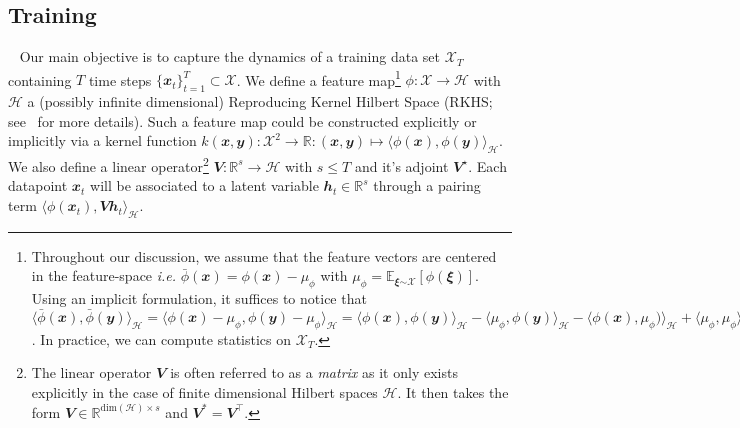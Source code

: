 \subsection{Training}~\label{sec:training}
Our main objective is to capture the dynamics of a training data set $\mathcal{X}_T$ containing $T$ time steps $\{\mathbfit{x}_{t}\}_{t=1} ^{T} \subset{\mathscr{X}}$.
We define a feature map\footnote{Throughout our discussion, we assume that the feature vectors are centered in the feature-space \emph{i.e.} $\bar{\phi}(\mathbfit{x}) = \phi(\mathbfit{x}) - \mu_{\phi}$ with $\mu_{\phi} = \mathbb{E}_{\mathbfit{\xi}\mathcal{\sim X}}\left[\phi(\mathbfit{\xi})\right]$.
Using an implicit formulation, it suffices to notice that $\langle\bar{\phi}(\mathbfit{x}), \bar{\phi}(\mathbfit{y}) \rangle_{\mathscr{H}} = \langle\phi(\mathbfit{x}) - \mu_{\phi}, \phi(\mathbfit{y}) - \mu_{\phi} \rangle_{\mathscr{H}} = \langle\phi(\mathbfit{x}), \phi(\mathbfit{y})\rangle_{\mathscr{H}} - \langle\mu_{\phi}, \phi(\mathbfit{y})\rangle_{\mathscr{H}} - \langle\phi(\mathbfit{x}), \mu_{\phi})\rangle_{\mathscr{H}} + \langle\mu_{\phi}, \mu_{\phi}\rangle_{\mathscr{H}} = k(\mathbfit{x},\mathbfit{y}) - \mathbb{E}_{\mathbfit{\xi}\mathcal{\sim X}}\left[k(\mathbfit{\xi},\mathbfit{y})\right] - \mathbb{E}_{\mathbfit{\zeta}\mathcal{\sim X}}\left[k(\mathbfit{x},\mathbfit{\zeta})\right] + \mathbb{E}_{\mathbfit{\xi},\mathbfit{\zeta}\mathcal{\sim X}}\left[k(\mathbfit{\xi},\mathbfit{\zeta})\right]$.
In practice, we can compute statistics on $\mathcal{X}_T$.} $\phi: \mathscr{X} \rightarrow \mathscr{H}$ with $\mathscr{H}$ a (possibly infinite dimensional) Reproducing Kernel Hilbert Space (RKHS; see~\cite{scholkopf1997kernel} for more details).
Such a feature map could be constructed explicitly or implicitly via a kernel function $ k(\mathbfit{x},\mathbfit{y}) : \mathscr{X}^2 \rightarrow \mathbb{R} : \left(\mathbfit{x},\mathbfit{y} \right) \mapsto \langle\phi(\mathbfit{x}), \phi(\mathbfit{y})\rangle_{\mathscr{H}}$.
We also define a linear operator\footnote{The linear operator $\mathbfit{V}$ is often referred to as a \emph{matrix} as it only exists explicitly in the case of finite dimensional Hilbert spaces $\mathscr{H}$.
It then takes the form $\mathbfit{V} \in \mathbb{R}^{\mathrm{dim}(\mathscr{H}) \times s}$ and $\mathbfit{V}^* = \mathbfit{V}^{\top}$.} $\mathbfit{V}:\mathbb{R}^s \rightarrow \mathscr{H}$ with $s \leq T$ and it's adjoint $\mathbfit{V}^\star$.
Each datapoint $\mathbfit{x}_t$ will be associated to a latent variable $\mathbfit{h}_{t} \in \mathbb{R}^s$ through a pairing term $\langle \phi\left(\mathbfit{x}_t\right), \mathbfit{V} \mathbfit{h}_t \rangle_{\mathscr{H}}$.
